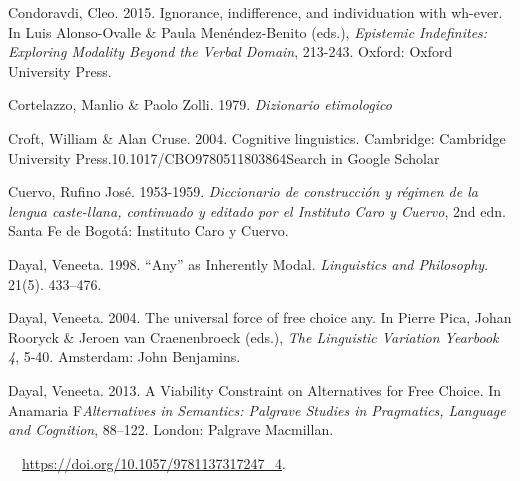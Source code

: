 \begin{styleStandard}
Condoravdi, Cleo. 2015. Ignorance, indifference, and individuation with wh-ever. In Luis Alonso-Ovalle \& Paula Menéndez-Benito (eds.), \textit{Epistemic Indefinites: Exploring Modality Beyond the Verbal Domain}, 213-243. Oxford: Oxford University Press.
\end{styleStandard}

\begin{styleStandard}
Cortelazzo, Manlio \& Paolo Zolli. 1979. \emph{\textmd{\textit{Dizionario etimologico}}}
\end{styleStandard}

\begin{styleStandard}
Croft, William \& Alan Cruse. 2004. Cognitive linguistics. Cambridge: Cambridge University Press.10.1017/CBO9780511803864Search in Google Scholar
\end{styleStandard}

\begin{styleStandard}
Cuervo, Rufino José. 1953-1959. \textit{Diccionario de construcción y régimen de la lengua caste-llana, continuado y editado por el Instituto Caro y Cuervo}, 2nd edn. Santa Fe de Bogotá: Instituto Caro y Cuervo.
\end{styleStandard}

\begin{styleStandard}
Dayal, Veneeta. 1998. “Any” as Inherently Modal. \textit{Linguistics and Philosophy}. 21(5). 433–476.
\end{styleStandard}

\begin{styleStandard}
Dayal, Veneeta. 2004. The universal force of free choice any. In Pierre Pica, Johan Rooryck \& Jeroen van Craenenbroeck (eds.), \textit{The Linguistic Variation Yearbook 4}, 5-40. Amsterdam: John Benjamins.
\end{styleStandard}

\begin{styleStandard}
Dayal, Veneeta. 2013. A Viability Constraint on Alternatives for Free Choice. In Anamaria F\textit{Alternatives in Semantics: Palgrave Studies in Pragmatics, Language and Cognition}, 88–122. London: Palgrave Macmillan. 
\end{styleStandard}

\begin{styleStandard}
\ \ \url{https://doi.org/10.1057/9781137317247_4}.
\end{styleStandard}


